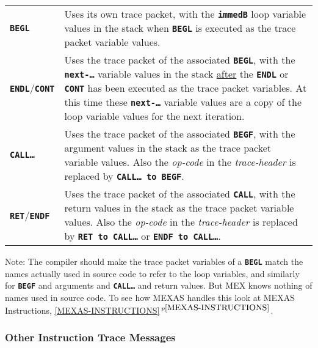 \documentclass[12pt]{article}
\newcommand{\TT}[1]{{\tt \bfseries #1}}
\newcommand{\itemref}[1]{\ref{#1}$\,^{p\pageref{#1}}$}
\begin{document}
\begin{center}
\begin{tabular}{lp{4.0in}}
\TT{BEGL}  & Uses its own trace packet, with the \TT{immedB} loop variable
             values in the stack when \TT{BEGL} is executed as the trace packet 
	     variable values.
\\[0.5ex]
\TT{ENDL}/\TT{CONT}  & Uses the trace packet of the associated \TT{BEGL},
                       with the \TT{next-\ldots} variable values in the
		       stack \underline{after} the \TT{ENDL} or \TT{CONT}
		       has been executed as the trace packet variables.
		       At this time these \TT{next-\ldots} variable values
		       are a copy of the loop variable values for the next
		       iteration.
\\[0.5ex]
\TT{CALL\ldots}  & Uses the trace packet of the associated \TT{BEGF},
                   with the argument values in the stack as the trace
		   packet variable values. 
		   Also the {\em op-code}
		   in the {\em trace-header} is replaced by
		   \TT{CALL\ldots{} to BEGF}.
\\[0.5ex]
\TT{RET}/\TT{ENDF}  & Uses the trace packet of the associated \TT{CALL},
                   with the return values in the stack as the trace
		   packet variable values.
		   Also the {\em op-code}
		   in the {\em trace-header} is replaced by
		   \TT{RET to CALL\ldots} or \TT{ENDF to CALL\ldots}.
\end{tabular}
\end{center}

Note: The compiler should make the trace packet variables of a \TT{BEGL}
match the names actually used in source code to refer to the loop
variables, and similarly for \TT{BEGF} and arguments and \TT{CALL\ldots}
and return values.
But MEX knows nothing of names used in source code.
To see how MEXAS handles this look at MEXAS Instructions,
\itemref{MEXAS-INSTRUCTIONS}.



\subsubsection{Other Instruction Trace Messages}
\label{OTHER-INSTRUCTION-TRACE-MESSAGES}
\end{document}
